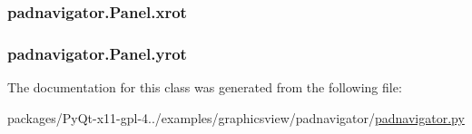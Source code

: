 \subsubsection[{xrot}]{\setlength{\rightskip}{0pt plus 5cm}padnavigator.\+Panel.\+xrot}\label{classpadnavigator_1_1Panel_a1af70904e44be11c0d1f4db9a71d197c}
\hypertarget{classpadnavigator_1_1Panel_a49ec5268862f024ca1c8c545307f834e}{}
\subsubsection[{yrot}]{\setlength{\rightskip}{0pt plus 5cm}padnavigator.\+Panel.\+yrot}\label{classpadnavigator_1_1Panel_a49ec5268862f024ca1c8c545307f834e}


The documentation for this class was generated from the following file\+:\begin{DoxyCompactItemize}
\item 
packages/\+Py\+Qt-\/x11-\/gpl-\/4../examples/graphicsview/padnavigator/\hyperlink{padnavigator_8py}{padnavigator.\+py}\end{DoxyCompactItemize}
